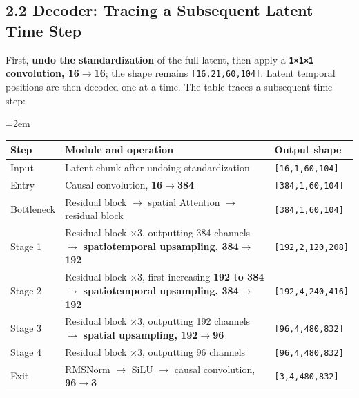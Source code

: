 \documentclass[
  11pt,
  a4paper,
]{article}
\newcounter{none} %
\newcommand{\NotesTableStyle}{\linespread{1}\fontsize{9.5pt}{13pt}\selectfont\setlength{\tabcolsep}{4pt}\renewcommand{\arraystretch}{1.1}\setlength{\extrarowheight}{5pt}\setlength{\LTpre}{5pt}\setlength{\LTpost}{6pt}\setlength{\parskip}{0pt}\emergencystretch=2em}
\begin{document}

\subsection{2.2 Decoder: Tracing a Subsequent Latent Time
Step}\label{wan21-decoder}

First, \textbf{undo the standardization} of the full latent, then apply
a \textbf{\texttt{1×1×1} convolution, 16\(\rightarrow\)16}; the shape
remains \texttt{{[}16,21,60,104{]}}. Latent temporal positions are then
decoded one at a time. The table traces a subsequent time step:

\begingroup\NotesTableStyle\fontsize{10pt}{12pt}\selectfont\renewcommand{\arraystretch}{1.02}\setlength{\extrarowheight}{1pt}

{\def\LTcaptype{none} %
\begin{longtable}[]{@{}
  >{\raggedright\arraybackslash}p{}
  >{\raggedright\arraybackslash}p{}
  >{\raggedright\arraybackslash}p{}@{}}
\toprule\noalign{}
\begin{minipage}[b]{\linewidth}\raggedright
Step
\end{minipage} & \begin{minipage}[b]{\linewidth}\raggedright
Module and operation
\end{minipage} & \begin{minipage}[b]{\linewidth}\raggedright
Output shape
\end{minipage} \\
\midrule\noalign{}
\endhead
\bottomrule\noalign{}
\endlastfoot
Input & Latent chunk after undoing standardization &
\texttt{{[}16,1,60,104{]}} \\
Entry & Causal convolution, \textbf{16\(\rightarrow\)384} &
\texttt{{[}384,1,60,104{]}} \\
Bottleneck & Residual block \(\rightarrow\) spatial Attention
\(\rightarrow\) residual block & \texttt{{[}384,1,60,104{]}} \\
Stage 1 & Residual block ×3, outputting 384 channels \(\rightarrow\)
\textbf{spatiotemporal upsampling, 384\(\rightarrow\)192} &
\texttt{{[}192,2,120,208{]}} \\
Stage 2 & Residual block ×3, first increasing \textbf{192 to 384}
\(\rightarrow\) \textbf{spatiotemporal upsampling,
384\(\rightarrow\)192} & \texttt{{[}192,4,240,416{]}} \\
Stage 3 & Residual block ×3, outputting 192 channels \(\rightarrow\)
\textbf{spatial upsampling, 192\(\rightarrow\)96} &
\texttt{{[}96,4,480,832{]}} \\
Stage 4 & Residual block ×3, outputting 96 channels &
\texttt{{[}96,4,480,832{]}} \\
Exit & RMSNorm \(\rightarrow\) SiLU \(\rightarrow\) causal convolution,
\textbf{96\(\rightarrow\)3} & \texttt{{[}3,4,480,832{]}} \\
\end{longtable}
}
\end{document}
